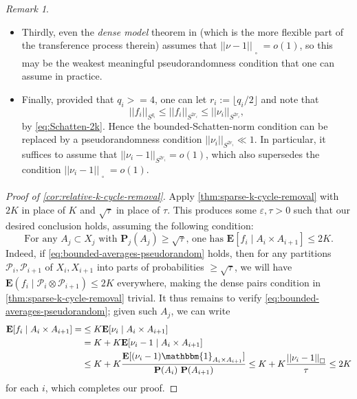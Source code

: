 \documentclass[reqno,11pt]{amsart}
\theoremstyle{definition}
\theoremstyle{remark}
\newtheorem*{remark}{Remark}
\numberwithin{equation}{section}
\renewcommand{\P}{\mathbf{P}}
\newcommand{\E}{\mathbf{E}}
\newcommand{\mP}{\mathcal{P}}
\newcommand{\one}{\mathbbm{1}}
\newcommand{\eps}{\varepsilon}
\newcommand{\sq}{_{\substack{ \\ \square}}}
\begin{document}
\begin{remark}
\begin{itemize}
    \item[(3).] Thirdly, even the \emph{dense model} theorem in \cite{conlon2014green} (which is the more flexible part of the transference process therein) assumes that $||\nu - 1||\sq = o(1)$, so this may be the weakest meaningful pseudorandomness condition that one can assume in practice.
    \item[(4).] Finally, provided that $q_i >= 4$, one can let $r_i := \lfloor q_i/2 \rfloor$ and note that
    \[
      ||f_i||_{S^{q_i}} \le ||f_i||_{S^{2r_i}} \le ||\nu_i||_{S^{2r_i}},
    \]
    by \cref{eq:Schatten-2k}. Hence the bounded-Schatten-norm condition can be replaced by a pseudorandomness condition $||\nu_i||_{S^{2r_i}} \ll 1$. In particular, it suffices to assume that $||\nu_i - 1||_{S^{2r_i}} = o(1)$, which also supersedes the condition $||\nu_i - 1||\sq = o(1)$.
\end{itemize}
\end{remark}


\begin{proof}[Proof of \cref{cor:relative-k-cycle-removal}]
Apply \cref{thm:sparse-k-cycle-removal} with $2K$ in place of $K$ and $\sqrt{\tau}$ in place of $\tau$. This produces some $\eps, \tau > 0$ such that our desired conclusion holds, assuming the following condition:
\begin{equation} \label{eq:bounded-averages-pseudorandom}
    \text{For any $A_j \subset X_j$ with $\P_j(A_j) \ge \sqrt{\tau}$, one has $\E[f_i \mid A_i \times A_{i+1}] \le 2K$.}
\end{equation}
Indeed, if \cref{eq:bounded-averages-pseudorandom} holds, then for any partitions $\mP_i, \mP_{i+1}$ of $X_i, X_{i+1}$ into parts of probabilities $\ge \sqrt{\tau}$, we will have $\E(f_i \mid \mP_i \otimes \mP_{i+1}) \le 2K$ everywhere, making the dense pairs condition in \cref{thm:sparse-k-cycle-removal} trivial. It thus remains to verify \cref{eq:bounded-averages-pseudorandom}; given such $A_j$, we can write
\[
\begin{aligned}
    \E[f_i \mid A_i \times A_{i+1}] = 
    &\le 
    K\E[\nu_i \mid A_i \times A_{i+1}]
    \\
    &= 
    K +
    K\E[\nu_i - 1 \mid A_i \times A_{i+1}]
    \\
    &\le
    K +
    K\frac{\E[(\nu_i - 1) \one_{A_i \times A_{i+1}}]}{\P(A_i)\ \P(A_{i+1})}
    \le 
    K + K \frac{||\nu_i - 1||\sq}{\tau} \le 2K
\end{aligned}    
\]
for each $i$, which completes our proof.
\end{proof}
\end{document}

